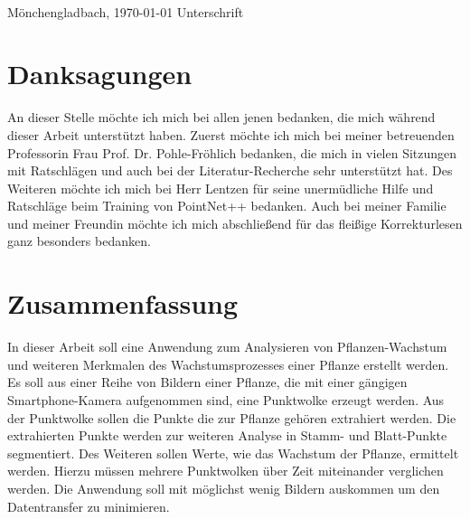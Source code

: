 \documentclass[12pt,titlepage, twoside]{article}
\begin{document}
\vspace{8ex}
\begin{tabbing}
\underline{\hspace{16em}} \hspace{3em}\= \underline{\hspace{14em}} \\
Mönchengladbach, \today \> Unterschrift
\end{tabbing}

\newpage


\section*{Danksagungen}

An dieser Stelle möchte ich mich bei allen jenen bedanken, die mich während dieser Arbeit unterstützt haben.
Zuerst möchte ich mich bei meiner betreuenden Professorin Frau Prof. Dr. Pohle-Fröhlich bedanken, die mich in vielen Sitzungen mit Ratschlägen und auch bei der Literatur-Recherche sehr unterstützt hat.
Des Weiteren möchte ich mich bei Herr Lentzen für seine unermüdliche Hilfe und Ratschläge beim Training von PointNet++ bedanken.
Auch bei meiner Familie und meiner Freundin möchte ich mich abschließend für das fleißige Korrekturlesen ganz besonders bedanken.

\newpage
\section*{Zusammenfassung}
In dieser Arbeit soll eine Anwendung zum Analysieren von Pflanzen-Wachstum und weiteren Merkmalen des Wachstumsprozesses einer Pflanze erstellt werden. 
Es soll aus einer Reihe von Bildern einer Pflanze, die mit einer gängigen Smartphone-Kamera aufgenommen sind, eine Punktwolke erzeugt werden. 
Aus der Punktwolke sollen die Punkte die zur Pflanze gehören extrahiert werden. 
Die extrahierten Punkte werden zur weiteren Analyse in Stamm- und Blatt-Punkte segmentiert.
Des Weiteren sollen Werte, wie das Wachstum der Pflanze, ermittelt werden. Hierzu müssen mehrere Punktwolken über Zeit miteinander verglichen werden.
Die Anwendung soll mit möglichst wenig Bildern auskommen um den Datentransfer zu minimieren.

\setcounter{page}{1}
\end{document}
